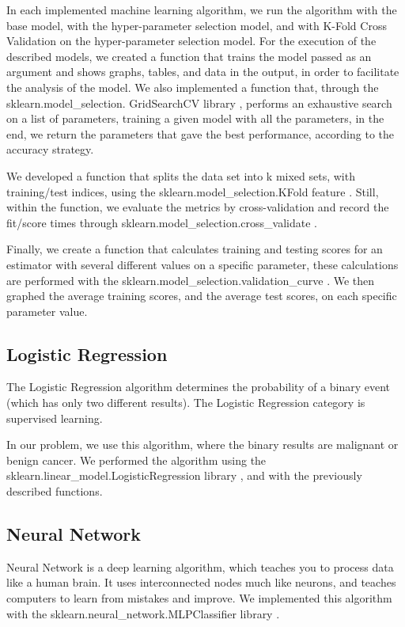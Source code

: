 \documentclass[conference]{IEEEtran}
\begin{document}
In each implemented machine learning algorithm, we run the algorithm with the base model, with the hyper-parameter selection model, and with K-Fold Cross Validation on the hyper-parameter selection model. For the execution of the described models, we created a function that trains the model passed as an argument and shows graphs, tables, and data in the output, in order to facilitate the analysis of the model.
We also implemented a function that, through the sklearn.model\_selection. GridSearchCV library \cite{grid-search-cV}, performs an exhaustive search on a list of parameters, training a given model with all the parameters, in the end, we return the parameters that gave the best performance, according to the accuracy strategy.

We developed a function that splits the data set into k mixed sets, with training/test indices, using the sklearn.model\_selection.KFold feature \cite{k-fold}. Still, within the function, we evaluate the metrics by cross-validation and record the fit/score times through sklearn.model\_selection.cross\_validate \cite{cross-validate}.

Finally, we create a function that calculates training and testing scores for an estimator with several different values on a specific parameter, these calculations are performed with the sklearn.model\_selection.validation\_curve \cite{validation-curve}. We then graphed the average training scores, and the average test scores, on each specific parameter value.

\subsection{Logistic Regression}
The Logistic Regression \cite{logistic-regression-def} algorithm determines the probability of a binary event (which has only two different results). The Logistic Regression category is supervised learning.

In our problem, we use this algorithm, where the binary results are malignant or benign cancer. We performed the algorithm using the sklearn.linear\_model.LogisticRegression library \cite{logistic-regression}, and with the previously described functions.

\subsection{Neural Network}
Neural Network \cite{neural-networks-def} is a deep learning algorithm, which teaches you to process data like a human brain. It uses interconnected nodes much like neurons, and teaches computers to learn from mistakes and improve. We implemented this algorithm with the sklearn.neural\_network.MLPClassifier library \cite{MLPClassifier}.
\end{document}
